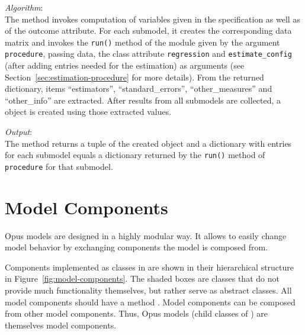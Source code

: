 {{\it Algorithm}:~\\[1mm]
The method invokes computation of variables \variablesindex given in the specification as well
as of the outcome attribute. \attributesindex For each submodel, it creates the corresponding
data matrix and invokes the \verb|run()| method of the module given by the
argument \verb|procedure|, passing data, the class attribute \attributesindex \verb|regression|
and \verb|estimate_config| (after adding entries needed for the estimation) as
arguments (see Section~\ref{sec:estimation-procedure} for more details). From
the returned dictionary, items ``estimators'', ``standard_errors'',
``other_measures'' and ``other_info'' are extracted.  After results from all
submodels are collected, a  \coefficientsindex object is created using those
extracted values.

{\it Output}:~\\[1mm]
The method returns a tuple of the created  object and a
dictionary with entries for each submodel equals a dictionary returned by the
\verb|run()| method of \verb|procedure| for that submodel.


\section{Model Components}
%
\label{sec:model-components}
Opus models are designed in a highly modular way. It allows to easily change
model behavior by exchanging components the model is composed from.

Components implemented as classes in  are shown in their hierarchical
structure in Figure~\ref{fig:model-components}. The shaded boxes are classes
that do not provide much functionality themselves, but rather serve as
abstract classes. All model components should have a method .
Model components can be composed from other model components.  Thus, Opus
models (child classes of ) are themselves model components.

}
